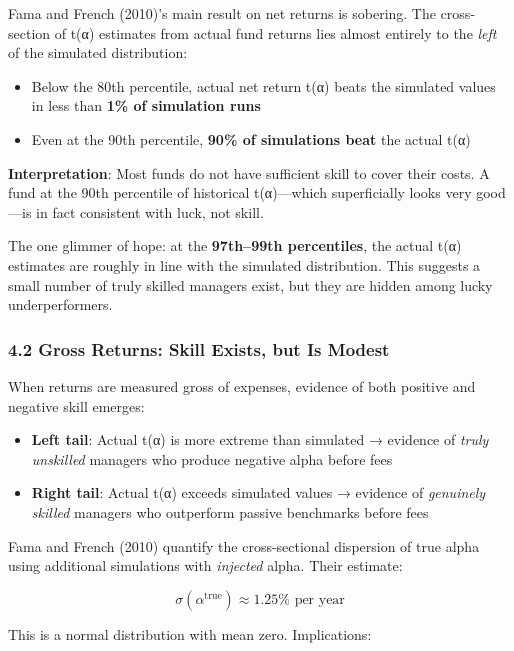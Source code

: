 \documentclass[
  letterpaper,
  DIV=11,
  numbers=noendperiod]{scrartcl}
\providecommand{\tightlist}{%
  \setlength{\itemsep}{0pt}\setlength{\parskip}{0pt}}
\begin{document}
Fama and French (2010)'s main result on net returns is sobering. The
cross-section of t(α) estimates from actual fund returns lies almost
entirely to the \emph{left} of the simulated distribution:

\begin{itemize}
\tightlist
\item
  Below the 80th percentile, actual net return t(α) beats the simulated
  values in less than \textbf{1\% of simulation runs}
\item
  Even at the 90th percentile, \textbf{90\% of simulations beat} the
  actual t(α)
\end{itemize}

\textbf{Interpretation}: Most funds do not have sufficient skill to
cover their costs. A fund at the 90th percentile of historical
t(α)---which superficially looks very good---is in fact consistent with
luck, not skill.

The one glimmer of hope: at the \textbf{97th--99th percentiles}, the
actual t(α) estimates are roughly in line with the simulated
distribution. This suggests a small number of truly skilled managers
exist, but they are hidden among lucky underperformers.

\subsubsection{4.2 Gross Returns: Skill Exists, but Is
Modest}\label{gross-returns-skill-exists-but-is-modest}

When returns are measured gross of expenses, evidence of both positive
and negative skill emerges:

\begin{itemize}
\tightlist
\item
  \textbf{Left tail}: Actual t(α) is more extreme than simulated →
  evidence of \emph{truly unskilled} managers who produce negative alpha
  before fees
\item
  \textbf{Right tail}: Actual t(α) exceeds simulated values → evidence
  of \emph{genuinely skilled} managers who outperform passive benchmarks
  before fees
\end{itemize}

Fama and French (2010) quantify the cross-sectional dispersion of true
alpha using additional simulations with \emph{injected} alpha. Their
estimate:

\[\sigma(\alpha^{\text{true}}) \approx 1.25\% \text{ per year}\]

This is a normal distribution with mean zero. Implications:
\end{document}
